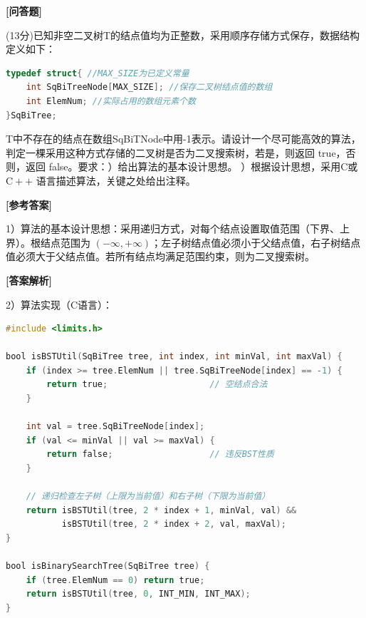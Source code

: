 \documentclass[12pt,a4paper]{article}
\newenvironment{choicequestion}[1][]{%
    \vspace{0.5cm}
    \noindent\textbf{[#1]}
    \vspace{0.2cm}
}{}
\newenvironment{answersection}{%
    \vspace{0.2cm}
    \noindent\textbf{[参考答案]}\\
    \vspace{0.1cm}
}{}
\newenvironment{analysissection}{%
    \vspace{0.2cm}
    \noindent\textbf{[答案解析]}\\
    \vspace{0.1cm}
}{}
\newcounter{questioncounter}
\newcounter{questioncounter}
\newcommand{\question}[2]{%
    \stepcounter{questioncounter}%
    \noindent\textbf{\thequestioncounter} #1%
}
\begin{document}
\begin{choicequestion}[问答题]
\question{(13分)已知非空二叉树T的结点值均为正整数，采用顺序存储方式保存，数据结构定义如下：\newline

\begin{lstlisting}[language=C]
typedef struct{ //MAX_SIZE为已定义常量
    int SqBiTreeNode[MAX_SIZE]; //保存二叉树结点值的数组
    int ElemNum; //实际占用的数组元素个数
}SqBiTree;
\end{lstlisting}\newline

T中不存在的结点在数组SqBiTNode中用-1表示。请设计一个尽可能高效的算法，判定一棵采用这种方式存储的二叉树是否为二叉搜索树，若是，则返回 true，否则，返回 false。要求：\newline
1）给出算法的基本设计思想。  \newline
2）根据设计思想，采用C或 $\mathrm{C}++$ 语言描述算法，关键之处给出注释。}{}

\begin{answersection}
1）算法的基本设计思想：采用递归方式，对每个结点设置取值范围（下界、上界）。根结点范围为 $(-\infty, +\infty)$；左子树结点值必须小于父结点值，右子树结点值必须大于父结点值。若所有结点均满足范围约束，则为二叉搜索树。
\end{answersection}

\begin{analysissection}
2）算法实现（C语言）：
\begin{lstlisting}[language=C]
#include <limits.h>

bool isBSTUtil(SqBiTree tree, int index, int minVal, int maxVal) {
    if (index >= tree.ElemNum || tree.SqBiTreeNode[index] == -1) {
        return true;                    // 空结点合法
    }
    
    int val = tree.SqBiTreeNode[index];
    if (val <= minVal || val >= maxVal) {
        return false;                   // 违反BST性质
    }
    
    // 递归检查左子树（上限为当前值）和右子树（下限为当前值）
    return isBSTUtil(tree, 2 * index + 1, minVal, val) &&
           isBSTUtil(tree, 2 * index + 2, val, maxVal);
}

bool isBinarySearchTree(SqBiTree tree) {
    if (tree.ElemNum == 0) return true;
    return isBSTUtil(tree, 0, INT_MIN, INT_MAX);
}
\end{lstlisting}
\end{analysissection}
\end{choicequestion}
\end{document}

